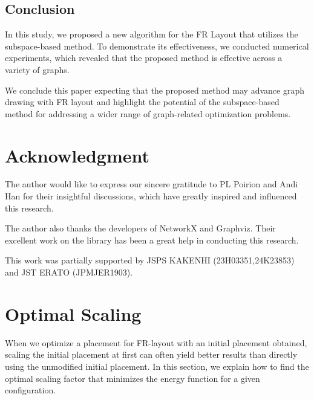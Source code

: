 \documentclass[dvipdfmx,journal]{IEEEtran}
\begin{document}
\subsection{Conclusion} \label{sec:conclusion}

In this study, we proposed a new algorithm for the FR Layout that utilizes the subspace-based method.
To demonstrate its effectiveness, we conducted numerical experiments, which revealed that the proposed method is effective across a variety of graphs.

We conclude this paper expecting that the proposed method may advance graph drawing with FR layout and highlight the potential of the subspace-based method for addressing a wider range of graph-related optimization problems.

\section{Acknowledgment}

The author would like to express our sincere gratitude to PL Poirion and Andi Han for their insightful discussions, which have greatly inspired and influenced this research.

The author also thanks the developers of NetworkX and Graphviz. Their excellent work on the library has been a great help in conducting this research.

This work was partially supported by JSPS KAKENHI (23H03351,24K23853) and JST ERATO (JPMJER1903).


\appendices

\section{Optimal Scaling}\label{sec:scaling}

When we optimize a placement for FR-layout with an initial placement obtained, scaling the initial placement at first can often yield better results than directly using the unmodified initial placement.
In this section, we explain how to find the optimal scaling factor that minimizes the energy function for a given configuration.
\end{document}
